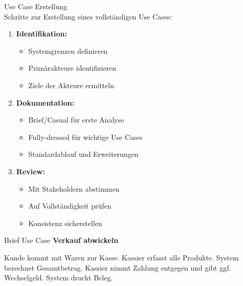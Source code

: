 \begin{KR}{Use Case Erstellung}\\
Schritte zur Erstellung eines vollständigen Use Cases:
\begin{enumerate}
    \item \textbf{Identifikation:}
    \begin{itemize}
        \item Systemgrenzen definieren
        \item Primärakteure identifizieren
        \item Ziele der Akteure ermitteln
    \end{itemize}
    \item \textbf{Dokumentation:}
    \begin{itemize}
        \item Brief/Casual für erste Analyse
        \item Fully-dressed für wichtige Use Cases
        \item Standardablauf und Erweiterungen
    \end{itemize}
    \item \textbf{Review:}
    \begin{itemize}
        \item Mit Stakeholdern abstimmen
        \item Auf Vollständigkeit prüfen
        \item Konsistenz sicherstellen
    \end{itemize}
\end{enumerate}
\end{KR}

\begin{example2}{Brief Use Case}
\textbf{Verkauf abwickeln}

Kunde kommt mit Waren zur Kasse. Kassier erfasst alle Produkte. System berechnet Gesamtbetrag. Kassier nimmt Zahlung entgegen und gibt ggf. Wechselgeld. System druckt Beleg.
\end{example2}


